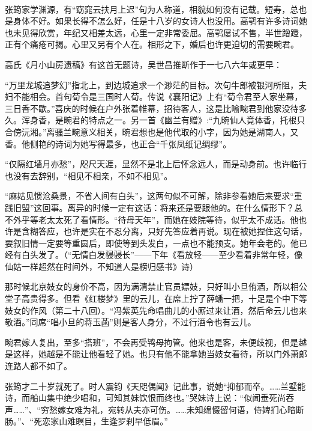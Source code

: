 \par  
\par 张筠家学渊源，有“窈窕云扶月上迟”句为人称道，相貌如何没有记载。短寿，总也是身体不好。如果长得不怎么好，任是十八岁的女诗人也没用。高鹗有许多诗词她也未见得欣赏，年纪又相差太远，心里一定非常委屈。高鹗屡试不售，半世蹭蹬，正有个痛疮可揭。心里又另有个人在。相形之下，婚后也许更迫切的需要畹君。
\par 高氏《月小山房遗稿》有这首无题诗，吴世昌推断作于一七八六年或更早：
\par “万里龙城追梦幻”指北上，到边城追求一个渺茫的目标。次句牛郎被银河所阻，夫妇不能相会。首句荀令是三国时人荀。传说《襄阳记》上有“荀令君至人家坐幕，三日香不歇。”喜庆的时候在户外张着帷幕，招待客人，这是比喻畹君到他家没待多久。浑身香，是畹君的特点之一。另一首《幽兰有赠》:“九畹仙人竟体香，托根只合傍沅湘。”离骚兰畹意义相关，畹君想也是他代取的小字，因为她是湖南人，又香。他侧艳的诗词为她写得最多，也正合“千张凤纸记绸缪”。
\par “仅隔红墙月亦愁”，咫尺天涯，显然不是北上后怀念远人，而是动身前。也许临行也没有去辞别，“相见不相亲，不如不相见”。
\par “麻姑见惯沧桑景，不省人间有白头”，这两句似不可解，除非参看她后来要求“重践旧盟”这回事。离异的时候一定有这话：将来还是要跟他的。在什么情形下？总不外乎等老太太死了看情形。“待母天年”，而她在妓院等待，似乎太不成话。他也许是含糊答应，也许是实在不忍分离，只好先答应着再说。现在被她捏住这句话，要叙旧情一定要等重圆后，即使等到头发白，一点也不能预支。她年会老的。他已经有白头发了。（“无情白发骎骎长”——下年《看放轻——至少看着非常年轻，像仙姑一样超然在时间外，不知道人是榜归感书》诗）
\par 那时候北京妓女的身价不高，因为满清禁止官员嫖妓，只好叫小旦侑酒，所以相公堂子高贵得多。但看《红楼梦》里的云儿，在席上拧了薛蟠一把，十足是个中下等妓女的作风（第二十八回）。“冯紫英先命唱曲儿的小厮过来让酒，然后命云儿也来敬酒。”同席“唱小旦的蒋玉菡”则是客人身分，不过行酒令也有云儿。
\par 畹君嫁人复出，至多“搭班”，不会再受鸨母拘管。他来也是客，未便歧视，但是越是这样，她越是不能让他看轻了她。也只有他不能拿她当妓女看待，所以门外萧郎连路人都不如了。
\par 张筠才二十岁就死了。时人震钧《天咫偶闻》记此事，说她“抑郁而卒。……兰墅能诗，而船山集中绝少唱和，可知其妹饮恨而终也。”哭妹诗上说：“似闻垂死尚吞声……”、“穷愁嫁女难为礼，宛转从夫亦可伤。……未知绵惙留何语，侍婢扪心暗断肠。”、“死恋家山难瞑目，生逢罗刹早低眉。”
